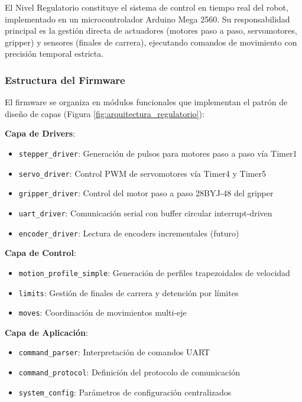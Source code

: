 El Nivel Regulatorio constituye el sistema de control en tiempo real del robot, implementado en un microcontrolador Arduino Mega 2560. Su responsabilidad principal es la gestión directa de actuadores (motores paso a paso, servomotores, gripper) y sensores (finales de carrera), ejecutando comandos de movimiento con precisión temporal estricta.

\subsubsection{Estructura del Firmware}

El firmware se organiza en módulos funcionales que implementan el patrón de diseño de capas (Figura \ref{fig:arquitectura_regulatorio}):

\textbf{Capa de Drivers}:
\begin{itemize}
    \item \texttt{stepper\_driver}: Generación de pulsos para motores paso a paso vía Timer1
    \item \texttt{servo\_driver}: Control PWM de servomotores vía Timer4 y Timer5
    \item \texttt{gripper\_driver}: Control del motor paso a paso 28BYJ-48 del gripper
    \item \texttt{uart\_driver}: Comunicación serial con buffer circular interrupt-driven
    \item \texttt{encoder\_driver}: Lectura de encoders incrementales (futuro)
\end{itemize}

\textbf{Capa de Control}:
\begin{itemize}
    \item \texttt{motion\_profile\_simple}: Generación de perfiles trapezoidales de velocidad
    \item \texttt{limits}: Gestión de finales de carrera y detención por límites
    \item \texttt{moves}: Coordinación de movimientos multi-eje
\end{itemize}

\textbf{Capa de Aplicación}:
\begin{itemize}
    \item \texttt{command\_parser}: Interpretación de comandos UART
    \item \texttt{command\_protocol}: Definición del protocolo de comunicación
    \item \texttt{system\_config}: Parámetros de configuración centralizados
\end{itemize}

